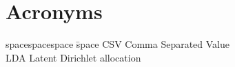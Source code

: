 \section*{Acronyms}

\begin{tabbing}
spacespacespace \= space \kill
CSV \> Comma Separated Value \\
LDA	\>	Latent Dirichlet allocation \\
\end{tabbing}